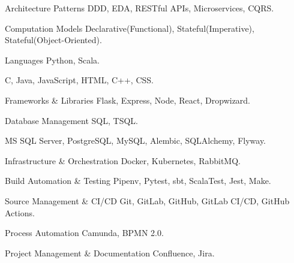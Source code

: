     \begin{cvskills}
        \cvskill
            {Architecture Patterns}
            { DDD, EDA, RESTful APIs, Microservices, CQRS.}

        \cvskill
            {Computation Models}
            { Declarative(Functional), Stateful(Imperative), Stateful(Object-Oriented).}

        \cvskill
            {Languages}
            { Python, Scala.}

        \cvskill
            {}
            { C, Java, JavaScript, HTML, C++, CSS.}

        \cvskill
            {Frameworks \& Libraries}
            { Flask, Express, Node, React, Dropwizard.}

        \cvskill
            {Database Management}
            { SQL, TSQL.}

        \cvskill
            {}
            { MS SQL Server, PostgreSQL, MySQL, Alembic, SQLAlchemy, Flyway.}

        \cvskill
            {Infrastructure \& Orchestration}
            { Docker, Kubernetes, RabbitMQ.}

        \cvskill
            {Build Automation \& Testing}
            { Pipenv, Pytest, sbt, ScalaTest, Jest, Make.}

        \cvskill
            {Source Management \& CI/CD}
            { Git, GitLab, GitHub, GitLab CI/CD, GitHub Actions.}

        \cvskill
            {Process Automation}
            { Camunda, BPMN 2.0.}

        \cvskill
            {Project Management \& Documentation}
            { Confluence, Jira.}
    \end{cvskills}
